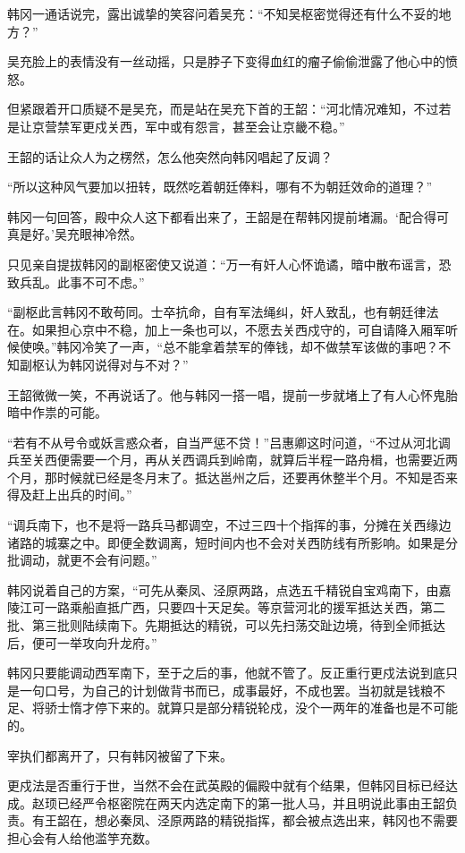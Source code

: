 韩冈一通话说完，露出诚挚的笑容问着吴充：“不知吴枢密觉得还有什么不妥的地方？”

吴充脸上的表情没有一丝动摇，只是脖子下变得血红的瘤子偷偷泄露了他心中的愤怒。

但紧跟着开口质疑不是吴充，而是站在吴充下首的王韶：“河北情况难知，不过若是让京营禁军更戍关西，军中或有怨言，甚至会让京畿不稳。”

王韶的话让众人为之楞然，怎么他突然向韩冈唱起了反调？

“所以这种风气要加以扭转，既然吃着朝廷俸料，哪有不为朝廷效命的道理？”

韩冈一句回答，殿中众人这下都看出来了，王韶是在帮韩冈提前堵漏。‘配合得可真是好。’吴充眼神冷然。

只见亲自提拔韩冈的副枢密使又说道：“万一有奸人心怀诡谲，暗中散布谣言，恐致兵乱。此事不可不虑。”

“副枢此言韩冈不敢苟同。士卒抗命，自有军法绳纠，奸人致乱，也有朝廷律法在。如果担心京中不稳，加上一条也可以，不愿去关西戍守的，可自请降入厢军听候使唤。”韩冈冷笑了一声，“总不能拿着禁军的俸钱，却不做禁军该做的事吧？不知副枢认为韩冈说得对与不对？”

王韶微微一笑，不再说话了。他与韩冈一搭一唱，提前一步就堵上了有人心怀鬼胎暗中作祟的可能。

“若有不从号令或妖言惑众者，自当严惩不贷！”吕惠卿这时问道，“不过从河北调兵至关西便需要一个月，再从关西调兵到岭南，就算后半程一路舟楫，也需要近两个月，那时候就已经是冬月末了。抵达邕州之后，还要再休整半个月。不知是否来得及赶上出兵的时间。”

“调兵南下，也不是将一路兵马都调空，不过三四十个指挥的事，分摊在关西缘边诸路的城寨之中。即便全数调离，短时间内也不会对关西防线有所影响。如果是分批调动，就更不会有问题。”

韩冈说着自己的方案，“可先从秦凤、泾原两路，点选五千精锐自宝鸡南下，由嘉陵江可一路乘船直抵广西，只要四十天足矣。等京营河北的援军抵达关西，第二批、第三批则陆续南下。先期抵达的精锐，可以先扫荡交趾边境，待到全师抵达后，便可一举攻向升龙府。”

韩冈只要能调动西军南下，至于之后的事，他就不管了。反正重行更戍法说到底只是一句口号，为自己的计划做背书而已，成事最好，不成也罢。当初就是钱粮不足、将骄士惰才停下来的。就算只是部分精锐轮戍，没个一两年的准备也是不可能的。

宰执们都离开了，只有韩冈被留了下来。

更戍法是否重行于世，当然不会在武英殿的偏殿中就有个结果，但韩冈目标已经达成。赵顼已经严令枢密院在两天内选定南下的第一批人马，并且明说此事由王韶负责。有王韶在，想必秦凤、泾原两路的精锐指挥，都会被点选出来，韩冈也不需要担心会有人给他滥竽充数。

